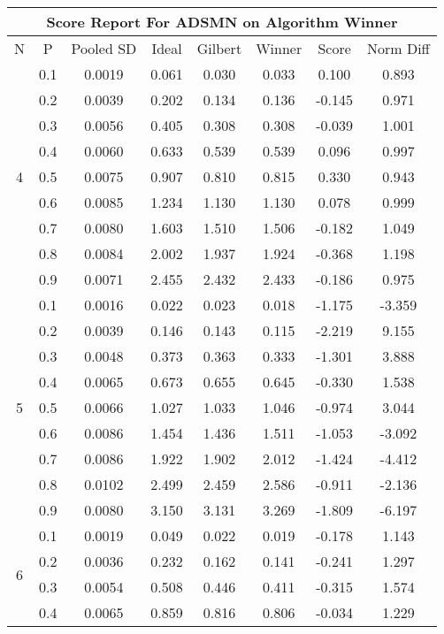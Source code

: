 \documentclass[11pt,a4paper]{report}
\begin{document}
\begin{longtable}{ | c | c || c | c | c | c | c | c | }
\hline
\multicolumn{8}{|c|}{ Score Report For ADSMN on Algorithm Winner} \\
\hline
N & P & Pooled SD &  Ideal &  Gilbert & Winner  & Score & Norm Diff \\
 \hline
 \hline
 \endhead
\multirow{9}{*}{4} & 0.1 & 0.0019 & 0.061 & 0.030 & 0.033 & 0.100 & 0.893 \\
 & 0.2 & 0.0039 & 0.202 & 0.134 & 0.136 & -0.145 & 0.971 \\
 & 0.3 & 0.0056 & 0.405 & 0.308 & 0.308 & -0.039 & 1.001 \\
 & 0.4 & 0.0060 & 0.633 & 0.539 & 0.539 & 0.096 & 0.997 \\
 & 0.5 & 0.0075 & 0.907 & 0.810 & 0.815 & 0.330 & 0.943 \\
 & 0.6 & 0.0085 & 1.234 & 1.130 & 1.130 & 0.078 & 0.999 \\
 & 0.7 & 0.0080 & 1.603 & 1.510 & 1.506 & -0.182 & 1.049 \\
 & 0.8 & 0.0084 & 2.002 & 1.937 & 1.924 & -0.368 & 1.198 \\
 & 0.9 & 0.0071 & 2.455 & 2.432 & 2.433 & -0.186 & 0.975 \\
 \hline
\multirow{9}{*}{5} & 0.1 & 0.0016 & 0.022 & 0.023 & 0.018 & -1.175 & -3.359 \\
 & 0.2 & 0.0039 & 0.146 & 0.143 & 0.115 & -2.219 & 9.155 \\
 & 0.3 & 0.0048 & 0.373 & 0.363 & 0.333 & -1.301 & 3.888 \\
 & 0.4 & 0.0065 & 0.673 & 0.655 & 0.645 & -0.330 & 1.538 \\
 & 0.5 & 0.0066 & 1.027 & 1.033 & 1.046 & -0.974 & 3.044 \\
 & 0.6 & 0.0086 & 1.454 & 1.436 & 1.511 & -1.053 & -3.092 \\
 & 0.7 & 0.0086 & 1.922 & 1.902 & 2.012 & -1.424 & -4.412 \\
 & 0.8 & 0.0102 & 2.499 & 2.459 & 2.586 & -0.911 & -2.136 \\
 & 0.9 & 0.0080 & 3.150 & 3.131 & 3.269 & -1.809 & -6.197 \\
 \hline
\multirow{9}{*}{6} & 0.1 & 0.0019 & 0.049 & 0.022 & 0.019 & -0.178 & 1.143 \\
 & 0.2 & 0.0036 & 0.232 & 0.162 & 0.141 & -0.241 & 1.297 \\
 & 0.3 & 0.0054 & 0.508 & 0.446 & 0.411 & -0.315 & 1.574 \\
 & 0.4 & 0.0065 & 0.859 & 0.816 & 0.806 & -0.034 & 1.229 \\

\end{longtable}
\end{document}
